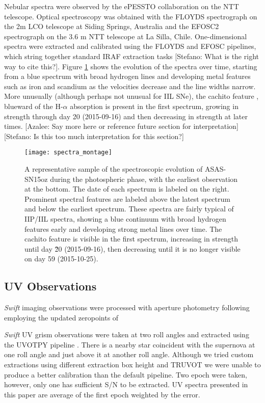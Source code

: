 \documentclass[preprint]{aastex61}
\newcommand{\azaleecomment}[1]{{\color{red} [{#1}]}}
\newcommand{\Azalee}[1]{\azaleecomment{Azalee: #1}}
\newcommand{\stefanocomment}[1]{{\color{cyan} [{#1}]}}
\newcommand{\Stefano}[1]{\stefanocomment{Stefano: #1}}
\begin{document}
Nebular spectra were observed by the ePESSTO collaboration on the NTT telescope. 
Optical spectroscopy was obtained with the FLOYDS spectrograph on the 2m LCO telescope at Siding Springs, Australia and the EFOSC2 spectrograph on the 3.6 m NTT telescope at La Silla, Chile. 
One-dimensional spectra were extracted and calibrated using the FLOYDS \citep{2014valenti} and EFOSC pipelines, which string together standard IRAF extraction tasks \Stefano{What is the right way to cite this?}. 
Figure \ref{fig:SpecAll} shows the evolution of the spectra over time, starting from a blue spectrum with broad hydrogen lines and developing metal features such as iron and scandium as the velocities decrease and the line widths narrow. More unusually (although perhaps not unusual for IIL SNe), the cachito feature \citep{2017gutierrez}, blueward of the H-$\alpha$ absorption is present in the first spectrum, growing in strength through day 20 (2015-09-16) and then decreasing in strength at later times. \Azalee{Say more here or reference future section for interpretation} \Stefano{Is this too much interpretation for this section?}

\begin{figure}[h!]
\begin{center}
\texttt{[image: spectra\_montage]} %
\caption{A representative sample of the spectroscopic evolution of ASAS-SN15oz during the photospheric phase, with the earliest observation at the bottom. 
The date of each spectrum is labeled on the right. Prominent spectral features are labeled above the latest spectrum and below the earliest spectrum. 
These spectra are fairly typical of IIP/IIL spectra, showing a blue continuum with broad hydrogen features early and developing strong metal lines over time.
The cachito feature is visible in the first spectrum, increasing in strength until day \~20 (2015-09-16), then decreasing until it is no longer visible on day 59 (2015-10-25).}
\label{fig:SpecAll}
\end{center}
\end{figure}
\subsection{UV Observations}
\textit{Swift} imaging observations were processed with aperture photometry following \citet{2009brown} employing the updated zeropoints of \citet{2010breeveld}

\textit{Swift} UV grism observations were taken at two roll angles and extracted using the UVOTPY pipeline \citep{2014kuin}. 
There is a nearby star coincident with the supernova at one roll angle and just above it at another roll angle.
Although we tried custom extractions using different extraction box height and TRUVOT \citep{2015smitka} we were unable to produce a better calibration than the default pipeline. 
Two epoch were taken, however, only one has sufficient S/N to be extracted. 
UV spectra presented in this paper are average of the first epoch weighted by the error. 
\end{document}
